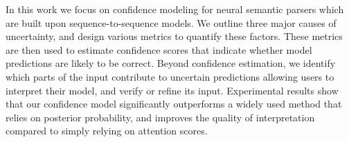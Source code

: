 In this work we focus on confidence modeling for neural semantic parsers which are built upon sequence-to-sequence models. We outline three major causes of uncertainty, and design various metrics to quantify these factors. These metrics are then used to estimate confidence scores that indicate whether model predictions are likely to be correct. Beyond confidence estimation, we identify which parts of the input contribute to uncertain predictions allowing users to interpret their model, and verify or refine its input. Experimental results show that our confidence model significantly outperforms a widely used method that relies on posterior probability, and improves the quality of interpretation compared to simply relying on attention scores.
